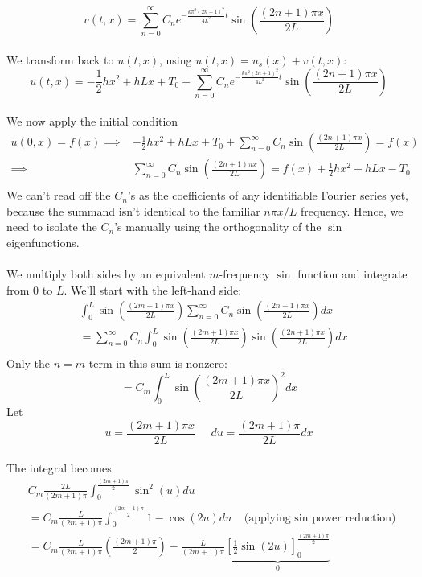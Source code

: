 \documentclass[12pt]{article}
\begin{document}
{$$v(t,x) = \sum_{n=0}^{\infty} C_n e^{- \frac{k \pi^2  \left(2n + 1 \right)^2}{4L^2} t} \sin \left( \frac{(2n+1)\pi x}{2L} \right)$$ \\
We transform back to $u(t,x)$, using $u(t,x) = u_s(x) + v(t,x)$: \\
$$u(t,x) = -\frac{1}{2} h x^2 + hLx + T_0 + \sum_{n=0}^{\infty} C_n e^{- \frac{k \pi^2  \left(2n + 1 \right)^2}{4L^2} t} \sin \left( \frac{(2n+1)\pi x}{2L} \right)$$ \\
We now apply the initial condition \\
\begin{align*}
u(0,x) = f(x) \implies& -\frac{1}{2} h x^2 + hLx + T_0 + \sum_{n=0}^{\infty} C_n \sin \left( \frac{(2n+1)\pi x}{2L} \right) = f(x)\\
\implies& \sum_{n=0}^{\infty} C_n \sin \left( \frac{(2n+1)\pi x}{2L} \right) = f(x) + \frac{1}{2} h x^2 - hLx - T_0 \\
\end{align*}
We can't read off the $C_n$'s as the coefficients of any identifiable Fourier series yet, because the summand isn't identical to the familiar $n\pi x / L$ frequency. Hence, we need to isolate the $C_n$'s manually using the orthogonality of the $\sin$ eigenfunctions. \\ \\ We multiply both sides by an equivalent $m$-frequency $\sin$ function and integrate from $0$ to $L$. We'll start with the left-hand side:
\begin{align*}
& \int_0^L \sin \left( \frac{(2m+1)\pi x}{2L}  \right) \sum_{n=0}^{\infty} C_n \sin \left( \frac{(2n+1)\pi x}{2L} \right) dx \\
&= \sum_{n=0}^{\infty}  C_n \int_0^L  \sin \left( \frac{(2m+1)\pi x}{2L}  \right) \sin \left( \frac{(2n+1)\pi x}{2L} \right) dx \\
\end{align*}
Only the $n=m$ term in this sum is nonzero:
$$= C_m \int_0^L  \sin \left( \frac{(2m+1)\pi x}{2L} \right)^2 dx$$
Let $$u = \frac{(2m+1)\pi x}{2L} \;\;\;\;\; du = \frac{(2m+1)\pi}{2L} dx$$  \\
The integral becomes
\begin{align*}
& C_m \frac{2L}{(2m + 1)\pi} \int_0^{\frac{(2m+1)\pi}{2}} \sin^2(u)du \\
&= C_m \frac{L}{(2m + 1)\pi} \int_0^{\frac{(2m+1)\pi}{2}} 1 - \cos(2u) du \;\;\; \text{(applying $\sin$ power reduction)}  \\
&= C_m \frac{L}{(2m + 1)\pi} \left( \frac{(2m+1)\pi}{2} \right) - \frac{L}{(2m+1)\pi} \underbrace{\left[ \frac{1}{2} \sin(2u) \right]_{0}^{\frac{(2m+1)\pi}{2}}}_{0} \\

\end{align*}}
\end{document}
